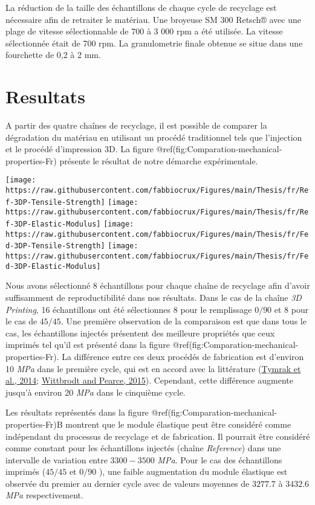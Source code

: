 \documentclass[
]{article}
\begin{document}
La réduction de la taille des échantillons de chaque cycle de recyclage
est nécessaire afin de retraiter le matériau. Une broyeuse SM 300
Retsch® avec une plage de vitesse sélectionnable de 700 à 3 000 rpm a
été utilisée. La vitesse sélectionnée était de 700 rpm. La granulometrie
finale obtenue se situe dans une fourchette de 0,2 à 2 mm.

\hypertarget{resultats}{%
\section{Resultats}\label{resultats}}

A partir des quatre chaînes de recyclage, il est possible de comparer la
dégradation du matériau en utilisant un procédé traditionnel tels que
l'injection et le procédé d'impression 3D. La figure
@ref(fig:Comparation-mechanical-properties-Fr) présente le résultat de
notre démarche expérimentale.

\begin{center}\texttt{[image: https://raw.githubusercontent.com/fabbiocrux/Figures/main/Thesis/fr/Ref-3DP-Tensile-Strength]} \texttt{[image: https://raw.githubusercontent.com/fabbiocrux/Figures/main/Thesis/fr/Ref-3DP-Elastic-Modulus]} \texttt{[image: https://raw.githubusercontent.com/fabbiocrux/Figures/main/Thesis/fr/Fed-3DP-Tensile-Strength]} \texttt{[image: https://raw.githubusercontent.com/fabbiocrux/Figures/main/Thesis/fr/Fed-3DP-Elastic-Modulus]} \end{center}

Nous avons sélectionné 8 échantillons pour chaque chaîne de recyclage
afin d'avoir suffisamment de reproductibilité dans nos résultats. Dans
le cas de la chaîne \emph{3D Printing}, 16 échantillons ont été
sélectionnes 8 pour le remplissage \(0/90\) et 8 pour le cas de
\(45/45\). Une première observation de la comparaison est que dans tous
le cas, les échantillons injectés présentent des meilleure propriétés
que ceux imprimés tel qu'il est présenté dans la figure
@ref(fig:Comparation-mechanical-properties-Fr). La différence entre ces
deux procédés de fabrication est d'environ 10 \emph{MPa} dans le
première cycle, qui est en accord avec la littérature
(\protect\hyperlink{ref-Tymrak2014a}{Tymrak et al., 2014};
\protect\hyperlink{ref-Wittbrodt2015}{Wittbrodt and Pearce, 2015}).
Cependant, cette différence augmente jusqu'à environ 20 \emph{MPa} dans
le cinquième cycle.

Les résultats représentés dans la figure
@ref(fig:Comparation-mechanical-properties-Fr)B montrent que le module
élastique peut être considéré comme indépendant du processus de
recyclage et de fabrication. Il pourrait être considéré comme constant
pour les échantillons injectés (chaîne \emph{Reference}) dans une
intervalle de variation entre \(3300-3500\) \emph{MPa}. Pour le cas des
échantillons imprimés (\(45/45\) et \(0/90\) ), une faible augmentation
du module élastique est observée du premier au dernier cycle avec de
valeurs moyennes de \(3277.7\) à \(3432.6\) \emph{MPa} respectivement.
\end{document}
